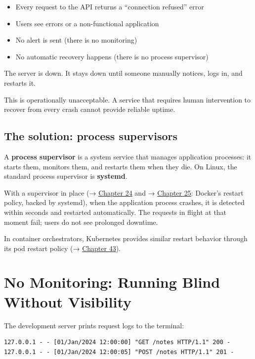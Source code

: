 \begin{itemize}
\tightlist
\item
  Every request to the API returns a ``connection refused'' error
\item
  Users see errors or a non-functional application
\item
  No alert is sent (there is no monitoring)
\item
  No automatic recovery happens (there is no process supervisor)
\end{itemize}

\noindent{}The server is down. It stays down until someone manually notices, logs in, and restarts it.

This is operationally unacceptable. A service that requires human intervention to recover from every crash cannot provide reliable uptime.

\subsection*{The solution: process supervisors}\label{11-reliability-security-gaps:the-solution-process-supervisors}

A \textbf{process supervisor} is a system service that manages application processes: it starts them, monitors them, and restarts them when they die. On Linux, the standard process supervisor is \textbf{systemd}.

With a supervisor in place (→ \hyperref[ch:24-process-startup]{Chapter 24} and → \hyperref[ch:25-process-management]{Chapter 25}: Docker's restart policy, backed by systemd), when the application process crashes, it is detected within seconds and restarted automatically. The requests in flight at that moment fail; users do not see prolonged downtime.

In container orchestrators, Kubernetes provides similar restart behavior through its pod restart policy (→ \hyperref[ch:43-cloud-native-orchestration]{Chapter 43}).

\setcounter{section}{1}
\section{No Monitoring: Running Blind Without Visibility}\label{11-reliability-security-gaps:112-no-monitoring-running-blind-without-visibility}

The development server prints request logs to the terminal:

\begin{outputbox}[short]
\begin{Verbatim}[fontsize=\codesize, breaklines, breakanywhere, breaksymbolleft={\tiny\textcolor{muted}{$\hookrightarrow$}}]
127.0.0.1 - - [01/Jan/2024 12:00:00] "GET /notes HTTP/1.1" 200 -
127.0.0.1 - - [01/Jan/2024 12:00:05] "POST /notes HTTP/1.1" 201 -
\end{Verbatim}
\end{outputbox}

